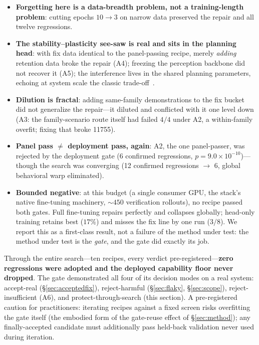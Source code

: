 \documentclass{article}
\begin{document}
\begin{itemize}
\item \textbf{Forgetting here is a data-breadth problem, not a training-length problem}: cutting epochs
$10\!\to\!3$ on narrow data preserved the repair and all twelve regressions.
\item \textbf{The stability--plasticity see-saw is real and sits in the planning head}: with fix data
identical to the panel-passing recipe, merely \emph{adding} retention data broke the repair (A4);
freezing the perception backbone did not recover it (A5); the interference lives in the shared planning
parameters, echoing at system scale the classic trade-off~\citep{french1999catastrophic}.
\item \textbf{Dilution is fractal}: adding same-family demonstrations to the fix bucket did not
generalize the repair---it diluted and conflicted with it one level down (A3: the family-scenario route
itself had failed $4/4$ under A2, a within-family overfit; fixing that broke 11755).
\item \textbf{Panel pass $\ne$ deployment pass, again}: A2, the one panel-passer, was rejected by the
deployment gate (6 confirmed regressions, $p=9.0\times10^{-10}$)---though the search was converging
(12 confirmed regressions $\to$ 6, global behavioral warp eliminated).
\item \textbf{Bounded negative}: at this budget (a single consumer GPU, the stack's native fine-tuning
machinery, ${\sim}450$ verification rollouts), no recipe passed both gates. Full fine-tuning repairs
perfectly and collapses globally; head-only training retains best ($17\%$) and misses the fix line by
one run ($3/8$). We report this as a first-class result, not a failure of the method under test: the
method under test is the \emph{gate}, and the gate did exactly its job.
\end{itemize}

Through the entire search---ten recipes, every verdict pre-registered---\textbf{zero regressions were
adopted and the deployed capability floor never dropped}. The gate demonstrated all four of its decision
modes on a real system: accept-real (\S\ref{sec:acceptedfix}), reject-harmful (\S\ref{sec:flaky},
\S\ref{sec:scope}), reject-insufficient (A6), and protect-through-search (this section). A
pre-registered caution for practitioners: iterating recipes against a fixed screen risks overfitting the
gate itself (the embodied form of the gate-reuse effect of \S\ref{sec:method}); any finally-accepted
candidate must additionally pass held-back validation never used during iteration.
\end{document}
